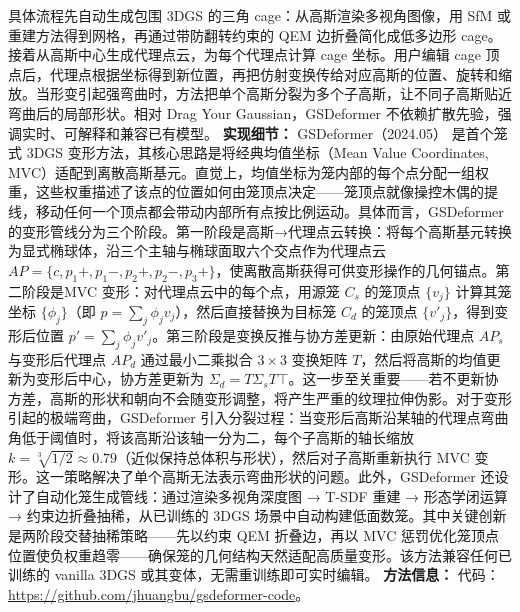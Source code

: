具体流程先自动生成包围 3DGS 的三角 cage：从高斯渲染多视角图像，用 SfM 或重建方法得到网格，再通过带防翻转约束的 QEM 边折叠简化成低多边形 cage。接着从高斯中心生成代理点云，为每个代理点计算 cage 坐标。用户编辑 cage 顶点后，代理点根据坐标得到新位置，再把仿射变换传给对应高斯的位置、旋转和缩放。当形变引起强弯曲时，方法把单个高斯分裂为多个子高斯，让不同子高斯贴近弯曲后的局部形状。相对 Drag Your Gaussian，GSDeformer 不依赖扩散先验，强调实时、可解释和兼容已有模型。
\textbf{实现细节：} GSDeformer（2024.05） 是首个笼式 3DGS 变形方法，其核心思路是将经典均值坐标（Mean Value Coordinates, MVC）适配到离散高斯基元。直觉上，均值坐标为笼内部的每个点分配一组权重，这些权重描述了该点的位置如何由笼顶点决定——笼顶点就像操控木偶的提线，移动任何一个顶点都会带动内部所有点按比例运动。具体而言，GSDeformer 的变形管线分为三个阶段。第一阶段是高斯→代理点云转换：将每个高斯基元转换为显式椭球体，沿三个主轴与椭球面取六个交点作为代理点云 $AP = \{c, p_1^{}+, p_1^{}-, p_2^{}+, p_2^{}-, p_3^{}+\}$，使离散高斯获得可供变形操作的几何锚点。第二阶段是MVC 变形：对代理点云中的每个点，用源笼 $C_s$ 的笼顶点 $\{v_j\}$ 计算其笼坐标 $\{\phi_j\}$（即 $p = \sum_j \phi_j v_j$），然后直接替换为目标笼 $C_d$ 的笼顶点 $\{v'_j\}$，得到变形后位置 $p' = \sum_j \phi_j v'_j$。第三阶段是变换反推与协方差更新：由原始代理点 $AP_s$ 与变形后代理点 $AP_d$ 通过最小二乘拟合 $3 \times 3$ 变换矩阵 $T$，然后将高斯的均值更新为变形后中心，协方差更新为 $\Sigma_d = T \Sigma_s T^{}\top$。这一步至关重要——若不更新协方差，高斯的形状和朝向不会随变形调整，将产生严重的纹理拉伸伪影。对于变形引起的极端弯曲，GSDeformer 引入分裂过程：当变形后高斯沿某轴的代理点弯曲角低于阈值时，将该高斯沿该轴一分为二，每个子高斯的轴长缩放 $k = \sqrt[3]{1/2} \approx 0.79$（近似保持总体积与形状），然后对子高斯重新执行 MVC 变形。这一策略解决了单个高斯无法表示弯曲形状的问题。此外，GSDeformer 还设计了自动化笼生成管线：通过渲染多视角深度图 → T-SDF 重建 → 形态学闭运算 → 约束边折叠抽稀，从已训练的 3DGS 场景中自动构建低面数笼。其中关键创新是两阶段交替抽稀策略——先以约束 QEM 折叠边，再以 MVC 惩罚优化笼顶点位置使负权重趋零——确保笼的几何结构天然适配高质量变形。该方法兼容任何已训练的 vanilla 3DGS 或其变体，无需重训练即可实时编辑。
\textbf{方法信息：} 代码：\url{https://github.com/jhuangbu/gsdeformer-code}。
